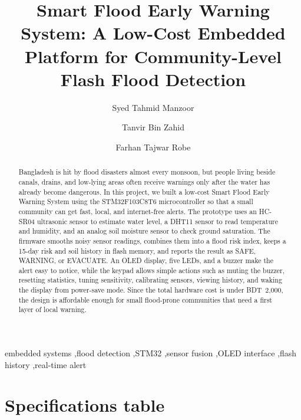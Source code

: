 \documentclass[5p,twocolumn]{elsarticle}
\begin{document}
\title{Smart Flood Early Warning System: A Low-Cost Embedded Platform for Community-Level Flash Flood Detection}

\author[1]{Syed Tahmid Manzoor}
\author[1]{Tanvir Bin Zahid}
\author[1]{Farhan Tajwar Robe}

\address[1]{Department of Electrical and Computer Engineering, School of Engineering and Physical Sciences,\\ North South University, Bashundhara, Dhaka-1229, Bangladesh}

\begin{abstract}
Bangladesh is hit by flood disasters almost every monsoon, but people living beside canals, drains, and low-lying areas often receive warnings only after the water has already become dangerous. In this project, we built a low-cost Smart Flood Early Warning System using the STM32F103C8T6 microcontroller so that a small community can get fast, local, and internet-free alerts. The prototype uses an HC-SR04 ultrasonic sensor to estimate water level, a DHT11 sensor to read temperature and humidity, and an analog soil moisture sensor to check ground saturation. The firmware smooths noisy sensor readings, combines them into a flood risk index, keeps a 15-day risk and soil history in flash memory, and reports the result as SAFE, WARNING, or EVACUATE. An OLED display, five LEDs, and a buzzer make the alert easy to notice, while the keypad allows simple actions such as muting the buzzer, resetting statistics, tuning sensitivity, calibrating sensors, viewing history, and waking the display from power-save mode. Since the total hardware cost is under BDT~2,000, the design is affordable enough for small flood-prone communities that need a first layer of local warning.
\end{abstract}

\begin{keyword}
embedded systems \sep flood detection \sep STM32 \sep sensor fusion \sep OLED interface \sep flash history \sep real-time alert
\end{keyword}


\section*{Specifications table}
\end{document}
